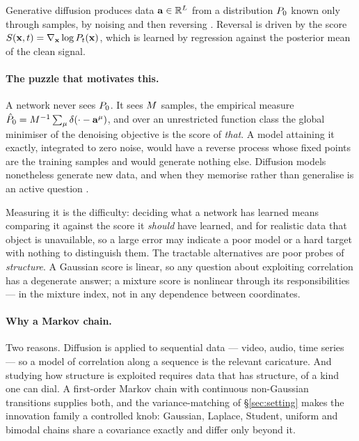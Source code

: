 \documentclass{article}
\theoremstyle{definition}
\theoremstyle{plain}
\begin{document}
Generative diffusion produces data $\mathbf{a}\in\mathbb{R}^{L}$ from a distribution $P_0$ known only
through samples, by noising and then reversing \citep{sohl2015deep,ho2020denoising,song2021scorebased}. Reversal is
driven by the score $S(\mathbf{x},t)=\nabla_{\mathbf{x}}\log P_t(\mathbf{x})$, which is learned by regression
against the posterior mean of the clean signal.

\paragraph{The puzzle that motivates this.} A network never sees $P_0$. It sees $M$ samples,
the empirical measure $\hat P_0 = M^{-1}\sum_\mu \delta(\cdot - \mathbf{a}^\mu)$, and over an
unrestricted function class the global minimiser of the denoising objective is the score of
\emph{that}. A model attaining it exactly, integrated to zero noise, would have a reverse process
whose fixed points are the training samples and would generate nothing else. Diffusion models
nonetheless generate new data, and when they memorise rather than generalise is an active question
\citep{biroli2023generative,biroli2024dynamical}.

Measuring it is the difficulty: deciding what a network has learned means comparing it against the
score it \emph{should} have learned, and for realistic data that object is unavailable, so a large
error may indicate a poor model or a hard target with nothing to distinguish them. The tractable
alternatives are poor probes of \emph{structure}. A Gaussian score is linear, so any question about
exploiting correlation has a degenerate answer; a mixture score is nonlinear through its
responsibilities --- in the mixture index, not in any dependence between coordinates.

\paragraph{Why a Markov chain.} Two reasons. Diffusion is applied to sequential data --- video,
audio, time series --- so a model of correlation along a sequence is the relevant caricature. And
studying how structure is exploited requires data that has structure, of a kind one can dial. A
first-order Markov chain with continuous non-Gaussian transitions supplies both, and the
variance-matching of \S\ref{sec:setting} makes the innovation family a controlled knob: Gaussian,
Laplace, Student, uniform and bimodal chains share a covariance exactly and differ only beyond it.
\end{document}
